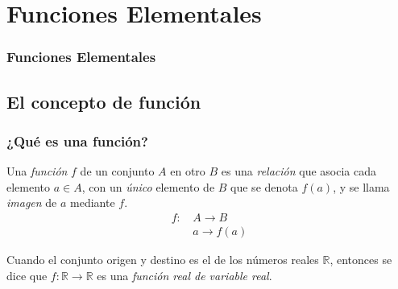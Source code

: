 
\section{Funciones Elementales}

\begin{frame}
\frametitle{Funciones Elementales}
\setlength{\parskip}{0.3em}
\tableofcontents[sectionstyle=show/hide,hideothersubsections]
\end{frame}

\subsection{El concepto de función}

\begin{frame}
\frametitle{¿Qué es una función?}
\begin{definicion}
Una \emph{función} $f$ de un conjunto $A$ en otro $B$ es una \emph{relación} que asocia cada elemento $a\in A$, con un \emph{único} elemento de $B$ que se denota $f(a)$, y se llama \emph{imagen} de $a$ mediante $f$.
\begin{align*}
f:\,&A\longrightarrow B\\
&a\longrightarrow f(a)
\end{align*}
\end{definicion}

\begin{center}
\scalebox{1}{}
\end{center}
Cuando el conjunto origen y destino es el de los números reales $\mathbb{R}$, entonces se dice que 
$f:\mathbb{R}\rightarrow \mathbb{R}$ es una \emph{función real de variable real}.
\end{frame}


